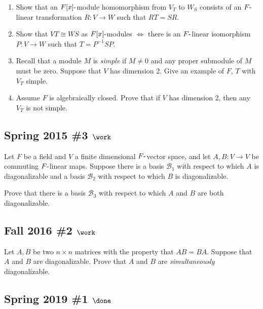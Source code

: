 \begin{enumerate}
\def\labelenumi{\alph{enumi}.}
\item
  Show that an \(F[x]{\hbox{-}}\)module homomorphism from \(V_T\) to
  \(W_S\) consists of an \(F{\hbox{-}}\)linear transformation
  \(R : V \to W\) such that \(RT = SR\).
\item
  Show that \(VT \cong WS\) as \(F[x]{\hbox{-}}\)modules \(\iff\) there
  is an \(F{\hbox{-}}\)linear isomorphism \(P : V \to W\) such that
  \(T = P^{-1}SP\).
\item
  Recall that a module \(M\) is \emph{simple} if \(M \neq 0\) and any
  proper submodule of \(M\) must be zero. Suppose that \(V\) has
  dimension 2. Give an example of \(F\), \(T\) with \(V_T\) simple.
\item
  Assume \(F\) is algebraically closed. Prove that if \(V\) has
  dimension 2, then any \(V_T\) is not simple.
\end{enumerate}

\hypertarget{spring-2015-3-work}{%
\subsection{\texorpdfstring{Spring 2015 \#3
\(\work\)}{Spring 2015 \#3 \textbackslash work}}\label{spring-2015-3-work}}

Let \(F\) be a field and \(V\) a finite dimensional
\(F{\hbox{-}}\)vector space, and let \(A, B: V\to V\) be commuting
\(F{\hbox{-}}\)linear maps. Suppose there is a basis \({\mathcal{B}}_1\)
with respect to which \(A\) is diagonalizable and a basis
\({\mathcal{B}}_2\) with respect to which \(B\) is diagonalizable.

Prove that there is a basis \({\mathcal{B}}_3\) with respect to which
\(A\) and \(B\) are both diagonalizable.

\hypertarget{fall-2016-2-work}{%
\subsection{\texorpdfstring{Fall 2016 \#2
\(\work\)}{Fall 2016 \#2 \textbackslash work}}\label{fall-2016-2-work}}

Let \(A, B\) be two \(n\times n\) matrices with the property that
\(AB = BA\). Suppose that \(A\) and \(B\) are diagonalizable. Prove that
\(A\) and \(B\) are \emph{simultaneously} diagonalizable.

\hypertarget{spring-2019-1-done}{%
\subsection{\texorpdfstring{Spring 2019 \#1
\(\done\)}{Spring 2019 \#1 \textbackslash done}}\label{spring-2019-1-done}}

